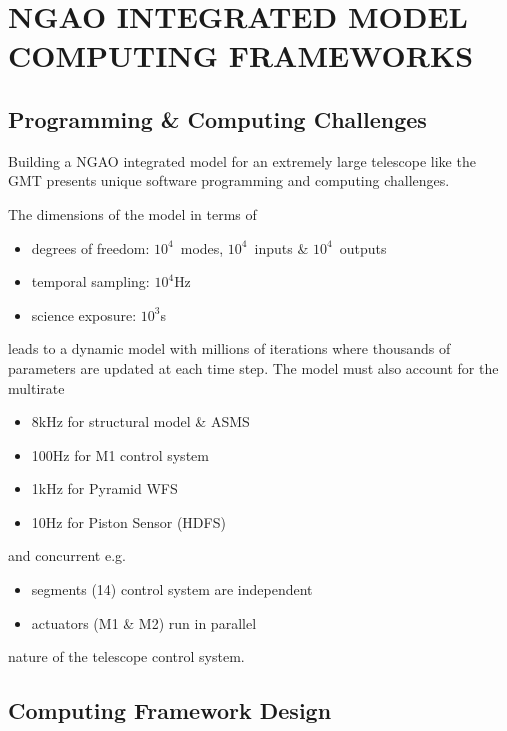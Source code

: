 \documentclass[]{AO4ELT}  %
\begin{document}
\section{NGAO INTEGRATED MODEL COMPUTING FRAMEWORKS}
\label{sec:framework}

\subsection{Programming \& Computing Challenges}
\label{sec:pc-challenge}

Building a NGAO integrated model for an extremely large telescope like the GMT presents unique software programming and computing challenges.

The dimensions of the model in terms of
\begin{itemize}
   \item degrees of freedom: $10^4$~modes, $10^4$~inputs \& $10^4$~outputs
   \item temporal sampling: $10^4$Hz
   \item science exposure: $10^3$s
\end{itemize}
leads to a dynamic model with millions of iterations where thousands of parameters are updated at each time step.
The model must also account for the multirate
\begin{itemize}
   \item 8kHz for structural model \& ASMS
   \item 100Hz for M1 control system
   \item 1kHz for Pyramid WFS
   \item 10Hz for Piston Sensor (HDFS)
\end{itemize}
and concurrent e.g.
\begin{itemize}
   \item segments (14) control system are independent
   \item actuators (M1 \& M2) run in parallel
\end{itemize}
nature of the telescope control system.

\subsection{Computing Framework Design}
\label{sec:framework-design}
\end{document}
